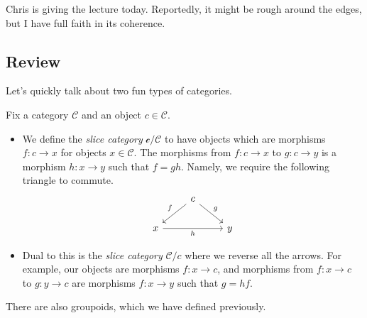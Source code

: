 \documentclass[../notes.tex]{subfiles}
\begin{document}

Chris is giving the lecture today. Reportedly, it might be rough around the edges, but I have full faith in its coherence.

\subsection{Review}
Let's quickly talk about two fun types of categories.
\begin{definition}
	Fix a category $\mathcal C$ and an object $c\in\mathcal C$.
	\begin{itemize}
		\item We define the \textit{slice category} $\mathcal c/\mathcal C$ to have objects which are morphisms $f:c\to x$ for objects $x\in\mathcal C$. The morphisms from $f:c\to x$ to $g:c\to y$ is a morphism $h:x\to y$ such that $f=gh$. Namely, we require the following triangle to commute.
		\[\begin{tikzcd}
			& c \\
			x && y
			\arrow["f"', from=1-2, to=2-1]
			\arrow["h"', from=2-1, to=2-3]
			\arrow["g", from=1-2, to=2-3]
		\end{tikzcd}\]
		\item Dual to this is the \textit{slice category} $\mathcal C/c$ where we reverse all the arrows. For example, our objects are morphisms $f:x\to c$, and morphisms from $f:x\to c$ to $g:y\to c$ are morphisms $f:x\to y$ such that $g=hf$.
	\end{itemize}
\end{definition}
There are also groupoids, which we have defined previously.
\end{document}
